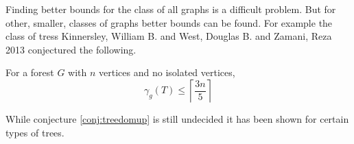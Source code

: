 
Finding better bounds for the class of all graphs is a difficult problem. But for other, smaller, classes of graphs better bounds can be found. For example the class of tress
Kinnersley, William B. and West, Douglas B. and Zamani, Reza 2013 \cite{KiWeZa2013} conjectured the following. 
\begin{conjecture} \label{conj:treedomup}
    For a forest $G$ with $n$ vertices and no isolated vertices,    
    \[ \gamma_g(T) \leq \left\lceil \frac{3n}{5} \right\rceil\]
\end{conjecture}
While conjecture \ref{conj:treedomup} is still undecided it has been shown for certain types of trees. 

